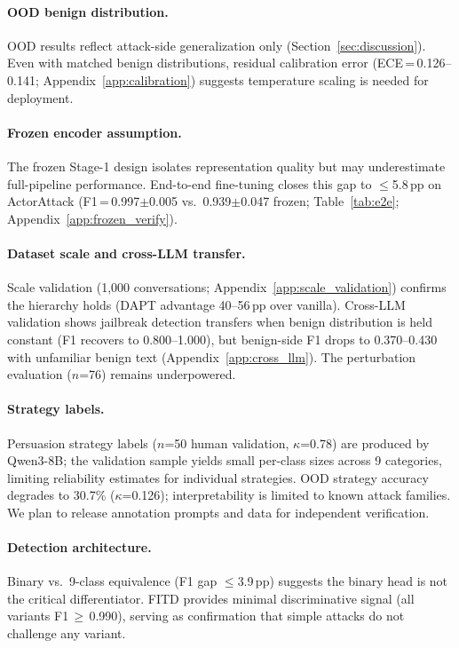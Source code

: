 \paragraph{OOD benign distribution.}
OOD results reflect attack-side generalization only (Section~\ref{sec:discussion}). Even with matched benign distributions, residual calibration error (ECE\,=\,0.126--0.141; Appendix~\ref{app:calibration}) suggests temperature scaling is needed for deployment.

\paragraph{Frozen encoder assumption.}
The frozen Stage-1 design isolates representation quality but may underestimate full-pipeline performance. End-to-end fine-tuning closes this gap to $\leq$5.8\,pp on ActorAttack (F1\,=\,0.997$\pm$0.005 vs.\ 0.939$\pm$0.047 frozen; Table~\ref{tab:e2e}; Appendix~\ref{app:frozen_verify}).

\paragraph{Dataset scale and cross-LLM transfer.}
Scale validation (1{,}000 conversations; Appendix~\ref{app:scale_validation}) confirms the hierarchy holds (DAPT advantage 40--56\,pp over vanilla). Cross-LLM validation shows jailbreak detection transfers when benign distribution is held constant (F1 recovers to 0.800--1.000), but benign-side F1 drops to 0.370--0.430 with unfamiliar benign text (Appendix~\ref{app:cross_llm}). The perturbation evaluation ($n$=76) remains underpowered.

\paragraph{Strategy labels.}
Persuasion strategy labels ($n$=50 human validation, $\kappa$=0.78) are produced by Qwen3-8B; the validation sample yields small per-class sizes across 9 categories, limiting reliability estimates for individual strategies. OOD strategy accuracy degrades to 30.7\% ($\kappa$=0.126); interpretability is limited to known attack families. We plan to release annotation prompts and data for independent verification.

\paragraph{Detection architecture.}
Binary vs.\ 9-class equivalence (F1 gap $\leq$3.9\,pp) suggests the binary head is not the critical differentiator. FITD provides minimal discriminative signal (all variants F1\,$\geq$\,0.990), serving as confirmation that simple attacks do not challenge any variant.

